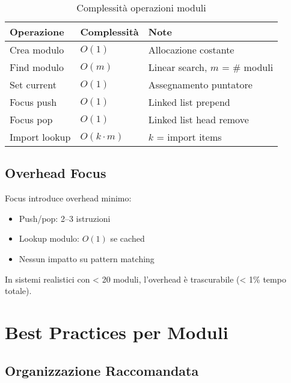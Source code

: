 \begin{table}[h]
\centering
\begin{tabular}{@{}lll@{}}
\toprule
\textbf{Operazione} & \textbf{Complessità} & \textbf{Note} \\
\midrule
Crea modulo & $O(1)$ & Allocazione costante \\
Find modulo & $O(m)$ & Linear search, $m$ = \# moduli \\
Set current & $O(1)$ & Assegnamento puntatore \\
Focus push & $O(1)$ & Linked list prepend \\
Focus pop & $O(1)$ & Linked list head remove \\
Import lookup & $O(k \cdot m)$ & $k$ = import items \\
\bottomrule
\end{tabular}
\caption{Complessità operazioni moduli}
\label{tab:module_complexity}
\end{table}

\subsection{Overhead Focus}

Focus introduce overhead minimo:
\begin{itemize}
\item Push/pop: 2--3 istruzioni
\item Lookup modulo: $O(1)$ se cached
\item Nessun impatto su pattern matching
\end{itemize}

\begin{successbox}[Performance]
In sistemi realistici con < 20 moduli, l'overhead è trascurabile (< 1\% tempo totale).
\end{successbox}

\section{Best Practices per Moduli}

\subsection{Organizzazione Raccomandata}

